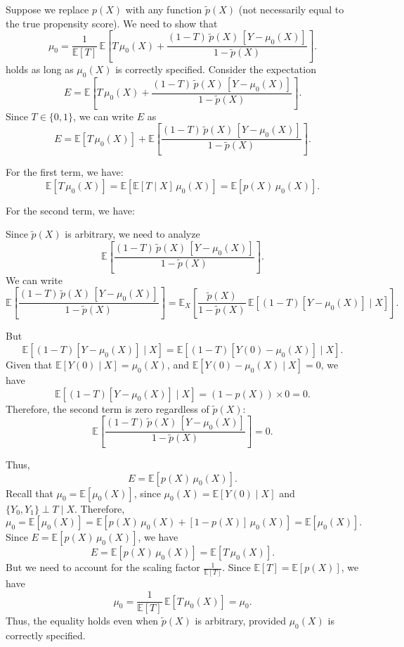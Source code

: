 \documentclass{article}
\begin{document}
Suppose we replace \( p(X) \) with any function \( \tilde{p}(X) \) (not necessarily equal to the true propensity score). We need to show that
\[
\mu_0 = \frac{1}{\mathbb{E}[T]} \, \mathbb{E} \left[ T \, \mu_0(X) + \frac{(1 - T) \, \tilde{p}(X) \, [Y - \mu_0(X)]}{1 - \tilde{p}(X)} \right].
\]
holds as long as \( \mu_0(X) \) is correctly specified.
Consider the expectation
\[
E = \mathbb{E} \left[ T \, \mu_0(X) + \frac{(1 - T) \, \tilde{p}(X) \, [Y - \mu_0(X)]}{1 - \tilde{p}(X)} \right].
\]
Since \( T \in \{0,1\} \), we can write \( E \) as
\[
E = \mathbb{E} \left[ T \, \mu_0(X) \right] + \mathbb{E} \left[ \frac{(1 - T) \, \tilde{p}(X) \, [Y - \mu_0(X)]}{1 - \tilde{p}(X)} \right].
\]

For the first term, we have:
\[
\mathbb{E} \left[ T \, \mu_0(X) \right] = \mathbb{E} \left[ \mathbb{E}[ T \mid X ] \, \mu_0(X) \right] = \mathbb{E} \left[ p(X) \, \mu_0(X) \right].
\]

For the second term, we have:

Since \( \tilde{p}(X) \) is arbitrary, we need to analyze
\[
\mathbb{E} \left[ \frac{(1 - T) \, \tilde{p}(X) \, [Y - \mu_0(X)]}{1 - \tilde{p}(X)} \right].
\]
We can write
\[
\mathbb{E} \left[ \frac{(1 - T) \, \tilde{p}(X) \, [Y - \mu_0(X)]}{1 - \tilde{p}(X)} \right] = \mathbb{E}_{X} \left[ \frac{ \tilde{p}(X) }{ 1 - \tilde{p}(X) } \, \mathbb{E} \left[ (1 - T) [Y - \mu_0(X)] \mid X \right] \right].
\]

But
\[
\mathbb{E} \left[ (1 - T) [Y - \mu_0(X)] \mid X \right] = \mathbb{E} \left[ (1 - T) [Y(0) - \mu_0(X)] \mid X \right].
\]
Given that \( \mathbb{E}[ Y(0) \mid X ] = \mu_0(X) \), and \( \mathbb{E}[ Y(0) - \mu_0(X) \mid X ] = 0 \), we have
\[
\mathbb{E} \left[ (1 - T) [Y - \mu_0(X)] \mid X \right] = (1 - p(X)) \times 0 = 0.
\]
Therefore, the second term is zero regardless of \( \tilde{p}(X) \):
\[
\mathbb{E} \left[ \frac{(1 - T) \, \tilde{p}(X) \, [Y - \mu_0(X)]}{1 - \tilde{p}(X)} \right] = 0.
\]

Thus,
\[
E = \mathbb{E} \left[ p(X) \, \mu_0(X) \right].
\]
Recall that \( \mu_0 = \mathbb{E} [ \mu_0(X) ] \), since \( \mu_0(X) = \mathbb{E}[ Y(0) \mid X ] \) and \( \{ Y_0, Y_1 \} \perp T \mid X \). Therefore,
\[
\mu_0 = \mathbb{E} \left[ \mu_0(X) \right] = \mathbb{E} \left[ p(X) \, \mu_0(X) + [1 - p(X)] \, \mu_0(X) \right] = \mathbb{E} \left[ \mu_0(X) \right].
\]
Since \( E = \mathbb{E} \left[ p(X) \, \mu_0(X) \right] \), we have
\[
E = \mathbb{E} \left[ p(X) \, \mu_0(X) \right] = \mathbb{E} \left[ T \, \mu_0(X) \right].
\]
But we need to account for the scaling factor \( \frac{1}{\mathbb{E}[T]} \). Since \( \mathbb{E}[T] = \mathbb{E} \left[ p(X) \right] \), we have
\[
\mu_0 = \frac{1}{\mathbb{E}[T]} \, \mathbb{E} \left[ T \, \mu_0(X) \right] = \mu_0.
\]
Thus, the equality holds even when \( \tilde{p}(X) \) is arbitrary, provided \( \mu_0(X) \) is correctly specified.
\end{document}
